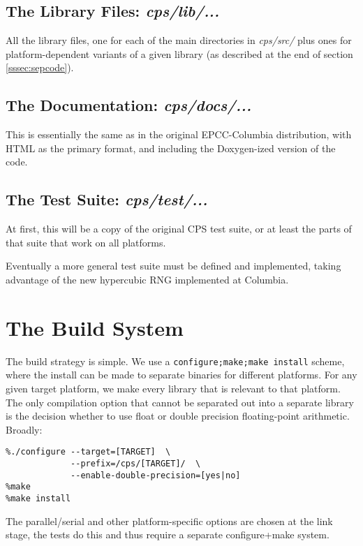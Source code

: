 \documentclass[12pt]{article}
\begin{document}
\subsection{The Library Files: \emph{cps/lib/...}}
All the library files, one for each of the main directories in \emph{cps/src/}
plus ones for platform-dependent variants of a given library (as described at
the end of section \ref{sssec:sepcode}).

\subsection{The Documentation: \emph{cps/docs/...}}
This is essentially the same as in the original EPCC-Columbia distribution,
with HTML as the primary format, and including the Doxygen-ized version of the
code.

\subsection{The Test Suite: \emph{cps/test/...}}
At first, this will be a copy of the original CPS test suite, or at
least the parts of that suite that work on all platforms.  

Eventually a more general test suite must be defined and implemented, taking
advantage of the new hypercubic RNG implemented at Columbia.


\section{The Build System}
\label{sec:build}
The build strategy is simple.  We use a {\tt{configure;make;make install}}
scheme, where the install can be made to separate binaries for different
platforms.  For any given target platform, we make every library that is relevant 
to that platform.  The only compilation option that cannot be separated out
into a separate library is the decision whether to use float or double
precision floating-point arithmetic.  Broadly:

\begin{verbatim}
%./configure --target=[TARGET]  \
             --prefix=/cps/[TARGET]/  \
             --enable-double-precision=[yes|no]
%make
%make install
\end{verbatim}

The parallel/serial and other platform-specific options are chosen at the link
stage, the tests do this and thus require a separate configure+make system.
\end{document}
